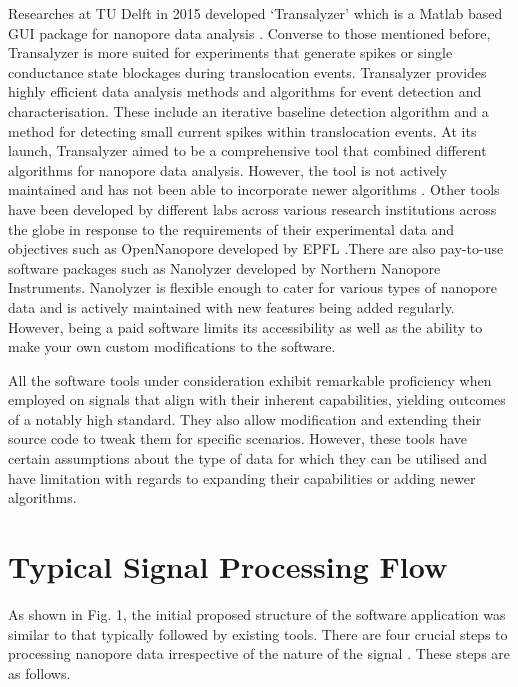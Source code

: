\documentclass[journal]{IEEEtran}
\begin{document}
Researches at TU Delft in 2015 developed ‘Transalyzer’ which is a Matlab based GUI package for nanopore data analysis \cite{plesaDataAnalysisMethods2015}. Converse to those mentioned before, Transalyzer is more suited for experiments that generate spikes or single conductance state blockages during translocation events. Transalyzer provides highly efficient data analysis methods and algorithms for event detection and characterisation. These include an iterative baseline detection algorithm and a method for detecting small current spikes within translocation events. At its launch, Transalyzer aimed to be a comprehensive tool that combined different algorithms for nanopore data analysis. However, the tool is not actively maintained and has not been able to incorporate newer algorithms \cite{plesaDataAnalysisMethods2015}. Other tools have been developed by different labs across various research institutions across the globe in response to the requirements of their experimental data and objectives such as OpenNanopore developed by EPFL \cite{raillonFastAutomaticProcessing2012}.There are also pay-to-use software packages such as Nanolyzer developed by Northern Nanopore Instruments. Nanolyzer is flexible enough to cater for various types of nanopore data and is actively maintained with new features being added regularly. However, being a paid software limits its accessibility as well as the ability to make your own custom modifications to the software.

All the software tools under consideration exhibit remarkable proficiency when employed on signals that align with their inherent capabilities, yielding outcomes of a notably high standard. They also allow modification and extending their source code to tweak them for specific scenarios. However, these tools have certain assumptions about the type of data for which they can be utilised and have limitation with regards to expanding their capabilities or adding newer algorithms.

\section{Typical Signal Processing Flow}
As shown in Fig. 1, the initial proposed structure of the software application was similar to that typically followed by existing tools. There are four crucial steps to processing nanopore data irrespective of the nature of the signal \cite{forstaterMOSAICModularSingleMolecule2016,gokhaleAdvancedSignalProcessing2023,plesaDataAnalysisMethods2015,wenGuideSignalProcessing2021}. These steps are as follows.
\end{document}
